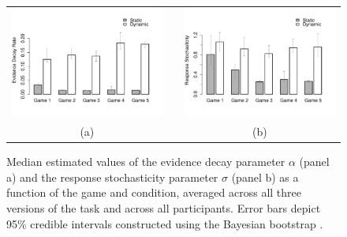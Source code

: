 \documentclass[authoryear]{elsarticle}
\begin{document}
\begin{figure}[p]
\begin{center}
\begin{tabular}{ccc}
\includegraphics[scale=.4]{decayRate.pdf} & \hspace*{.5cm} &
\includegraphics[scale=.4]{responseNoise.pdf} \\
(a) && (b)
\end{tabular}
\caption{Median estimated values of the evidence decay parameter $\alpha$ (panel a) and the response stochasticity parameter $\sigma$ (panel b) as a function of the game and condition, averaged across all three versions of the task and across all participants. Error bars depict 95\% credible intervals constructed using the Bayesian bootstrap \citep{rubin_bayesian_1981}.}
\label{fig:modelpars}
\end{center}
\end{figure}
\end{document}
